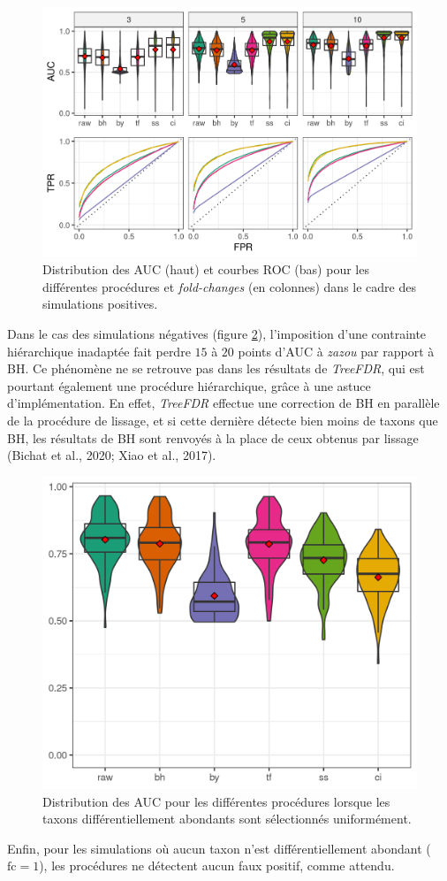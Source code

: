 \documentclass[12pt,a4paper]{reedthesis}
\theoremstyle{definition}
\theoremstyle{definition}
\theoremstyle{definition}
\theoremstyle{remark}
\begin{document}
\begin{figure}[!t]

{\centering \includegraphics[width=0.9\linewidth]{img/aucroc_zazou} 

}

\caption{Distribution des AUC (haut) et courbes ROC (bas) pour les différentes procédures et \emph{fold-changes} (en colonnes) dans le cadre des simulations positives.}\label{fig:aucroczazou}
\end{figure}
Dans le cas des simulations négatives (figure \ref{fig:aucnegzazou}), l'imposition d'une contrainte hiérarchique inadaptée fait perdre \(15\) à \(20\) points d'AUC à \emph{zazou} par rapport à BH. Ce phénomène ne se retrouve pas dans les résultats de \emph{TreeFDR}, qui est pourtant également une procédure hiérarchique, grâce à une astuce d'implémentation. En effet, \emph{TreeFDR} effectue une correction de BH en parallèle de la procédure de lissage, et si cette dernière détecte bien moins de taxons que BH, les résultats de BH sont renvoyés à la place de ceux obtenus par lissage (Bichat et al., 2020; Xiao et al., 2017).


\begin{figure}[!t]

{\centering \includegraphics[width=0.4\linewidth]{img/aucneg_zazou} 

}

\caption{Distribution des AUC pour les différentes procédures lorsque les taxons différentiellement abondants sont sélectionnés uniformément.}\label{fig:aucnegzazou}
\end{figure}
Enfin, pour les simulations où aucun taxon n'est différentiellement abondant (\(\text{fc} = 1\)), les procédures ne détectent aucun faux positif, comme attendu.
\end{document}
